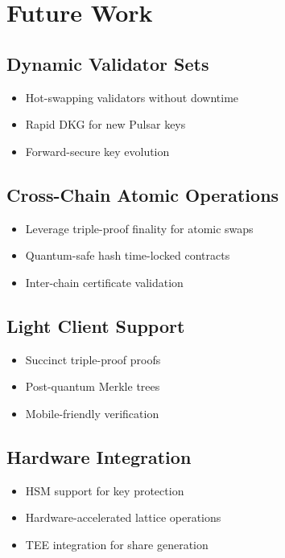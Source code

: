 \section{Future Work}


\subsection{Dynamic Validator Sets}
\begin{itemize}
\item Hot-swapping validators without downtime
\item Rapid DKG for new Pulsar keys
\item Forward-secure key evolution
\end{itemize}

\subsection{Cross-Chain Atomic Operations}
\begin{itemize}
\item Leverage triple-proof finality for atomic swaps
\item Quantum-safe hash time-locked contracts
\item Inter-chain certificate validation
\end{itemize}

\subsection{Light Client Support}
\begin{itemize}
\item Succinct triple-proof proofs
\item Post-quantum Merkle trees
\item Mobile-friendly verification
\end{itemize}

\subsection{Hardware Integration}
\begin{itemize}
\item HSM support for key protection
\item Hardware-accelerated lattice operations
\item TEE integration for share generation
\end{itemize}

